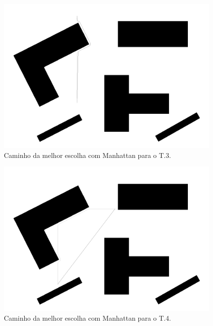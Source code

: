 \documentclass[12pt]{article}
\theoremstyle{plain}
\numberwithin{equation}{section}
\begin{document}
\begin{figure}[H]
  \centering\includegraphics[scale=0.4]{imgs/best_choice_manhattan_3.png}
  \caption{Caminho da melhor escolha com Manhattan para o T.3.}
\end{figure}

\begin{figure}[H]
  \centering\includegraphics[scale=0.4]{imgs/best_choice_manhattan_4.png}
  \caption{Caminho da melhor escolha com Manhattan para o T.4.}
\end{figure}
\end{document}
